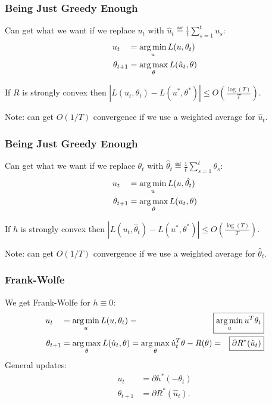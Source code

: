 \documentclass{beamer}
\begin{document}
\begin{frame}
\frametitle{Being Just Greedy Enough}
\reminder
Can get what we want if we replace $u_t$ with $\hat{u}_t \eqdef \frac{1}{t} \sum_{s=1}^t u_s$:
\begin{align*}
u_t\,\,\,\,\,\, &= \argmin_{u} L(u,\theta_t) \\
\theta_{t+1}    &= \argmax_{\theta} L(\hat{u}_t, \theta)
\end{align*}
\pause
\begin{theorem}
If $R$ is strongly convex then $|L(\hat{u}_t,\theta_t)-L(u^*,\theta^*)| \leq O\left(\frac{\log(T)}{T}\right)$.
\end{theorem}
Note: can get $O(1/T)$ convergence if we use a weighted average for $\hat{u}_t$.
\end{frame}

\begin{frame}
\frametitle{Being Just Greedy Enough}
\reminder
Can get what we want if we replace $\theta_t$ with $\hat{\theta}_t \eqdef \frac{1}{t} \sum_{s=1}^t \theta_s$:
\begin{align*}
u_t\,\,\,\,\,\, &= \argmin_{u} L(u,\hat{\theta_t}) \\
\theta_{t+1}    &= \argmax_{\theta} L(u_t, \theta)
\end{align*}

\begin{theorem}
If $h$ is strongly convex then $|L(u_t,\hat{\theta}_t)-L(u^*,\theta^*)| \leq O\left(\frac{\log(T)}{T}\right)$.
\end{theorem}
Note: can get $O(1/T)$ convergence if we use a weighted average for $\hat{\theta}_t$.
\end{frame}

\begin{frame}
\frametitle{Frank-Wolfe}
\reminder
We get Frank-Wolfe for $h \equiv 0$:
\begin{align*}
u_t\,\,\,\,\,\, &= \argmin_u L(u, \theta_t) = \Aboxed{\argmin_u u^T\theta_t} \\
\theta_{t+1}    &= \argmax_{\theta} L(\hat{u}_t, \theta) = \argmax_{\theta} \hat{u}_t^T\theta - R(\theta) = \Aboxed{\partial R^*(\hat{u}_t)}
\end{align*}
\pause
General updates:
\begin{align*}
u_t\,\,\,\,\,\, &= \partial h^*(-\theta_t) \\
\theta_{t+1} &= \partial R^*(\hat{u}_t).
\end{align*}
\end{frame}
\end{document}
